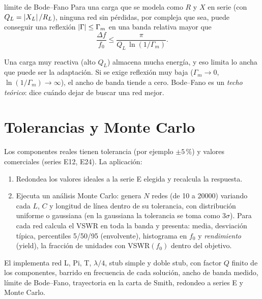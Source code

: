 \begin{definicion}{límite de Bode--Fano}
Para una carga que se modela como $R$ y $X$ en serie (con $Q_L = \left|X_L\right|/R_L$), ninguna red sin pérdidas, por compleja que sea, puede
conseguir una reflexión $\left|\Gamma\right| \le \Gamma_m$ en una banda relativa mayor que
\begin{equation}
  \frac{\Delta f}{f_0} \le \frac{\pi}{Q_L\,\ln(1/\Gamma_m)} .
\end{equation}
\begin{donde}
\end{donde}
\end{definicion}
\begin{intuicion}
Una carga muy reactiva (alto $Q_L$) almacena mucha energía, y eso limita lo ancha que puede ser la adaptación. Si se exige reflexión muy baja
($\Gamma_m\to 0$, $\ln(1/\Gamma_m)\to\infty$), el ancho de banda tiende a cero. Bode--Fano es un \emph{techo teórico}: dice cuándo dejar de
buscar una red mejor.
\end{intuicion}

\section{Tolerancias y Monte Carlo}
Los componentes reales tienen tolerancia (por ejemplo $\pm5\,\%$) y valores comerciales (series E12, E24). La aplicación:
\begin{enumerate}
\item Redondea los valores ideales a la serie E elegida y recalcula la respuesta.
\item Ejecuta un análisis Monte Carlo: genera $N$ redes (de 10 a \num{20000}) variando cada $L$, $C$ y longitud de línea dentro de su
tolerancia, con distribución uniforme o gaussiana (en la gaussiana la tolerancia se toma como $3\sigma$). Para cada red calcula el VSWR en
toda la banda y presenta: media, desviación típica, percentiles 5/50/95 (envolvente), histograma en $f_0$ y \emph{rendimiento} (yield),
la fracción de unidades con VSWR$(f_0)$ dentro del objetivo.
\end{enumerate}

\begin{enlaapp}
El  implementa red L, Pi, T, $\lambda/4$, stub simple y doble stub, con factor $Q$ finito de los componentes, barrido en
frecuencia de cada solución, ancho de banda medido, límite de Bode--Fano, trayectoria en la carta de Smith, redondeo a series E y Monte Carlo.
\end{enlaapp}

